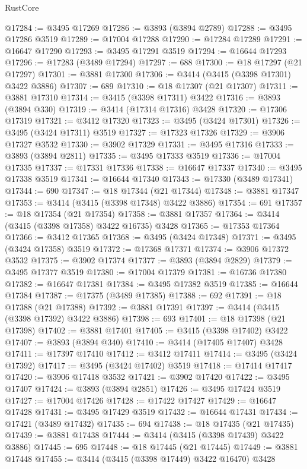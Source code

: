 \begin{lexlean}{RustCore}
\begin{coremodule}
@17284 := @3495 @17269
@17286 := @3893 (@3894 @2789)
@17288 := @3495 @17286 @3519
@17289 := @17004 @17288
@17290 := @17284 @17289
@17291 := @16647 @17290
@17293 := @3495 @17291 @3519
@17294 := @16644 @17293
@17296 := @17283 (@3489 @17294)
@17297 := 688
@17300 := @18 @17297 (@21 @17297)
@17301 := @3881 @17300
@17306 := @3414 (@3415 (@3398 @17301) @3422 @3886)
@17307 := 689
@17310 := @18 @17307 (@21 @17307)
@17311 := @3881 @17310
@17314 := @3415 (@3398 @17311) @3422
@17316 := @3893 (@3894 @330)
@17319 := @3414 (@17314 @17316) @3428
@17320 := @17306 @17319
@17321 := @3412 @17320
@17323 := @3495 (@3424 @17301)
@17326 := @3495 (@3424 @17311) @3519
@17327 := @17323 @17326
@17329 := @3906 @17327 @3532
@17330 := @3902 @17329
@17331 := @3495 @17316
@17333 := @3893 (@3894 @2811)
@17335 := @3495 @17333 @3519
@17336 := @17004 @17335
@17337 := @17331 @17336
@17338 := @16647 @17337
@17340 := @3495 @17338 @3519
@17341 := @16644 @17340
@17343 := @17330 (@3489 @17341)
@17344 := 690
@17347 := @18 @17344 (@21 @17344)
@17348 := @3881 @17347
@17353 := @3414 (@3415 (@3398 @17348) @3422 @3886)
@17354 := 691
@17357 := @18 @17354 (@21 @17354)
@17358 := @3881 @17357
@17364 := @3414 (@3415 (@3398 @17358) @3422 @16735) @3428
@17365 := @17353 @17364
@17366 := @3412 @17365
@17368 := @3495 (@3424 @17348)
@17371 := @3495 (@3424 @17358) @3519
@17372 := @17368 @17371
@17374 := @3906 @17372 @3532
@17375 := @3902 @17374
@17377 := @3893 (@3894 @2829)
@17379 := @3495 @17377 @3519
@17380 := @17004 @17379
@17381 := @16736 @17380
@17382 := @16647 @17381
@17384 := @3495 @17382 @3519
@17385 := @16644 @17384
@17387 := @17375 (@3489 @17385)
@17388 := 692
@17391 := @18 @17388 (@21 @17388)
@17392 := @3881 @17391
@17397 := @3414 (@3415 (@3398 @17392) @3422 @3886)
@17398 := 693
@17401 := @18 @17398 (@21 @17398)
@17402 := @3881 @17401
@17405 := @3415 (@3398 @17402) @3422
@17407 := @3893 (@3894 @340)
@17410 := @3414 (@17405 @17407) @3428
@17411 := @17397 @17410
@17412 := @3412 @17411
@17414 := @3495 (@3424 @17392)
@17417 := @3495 (@3424 @17402) @3519
@17418 := @17414 @17417
@17420 := @3906 @17418 @3532
@17421 := @3902 @17420
@17422 := @3495 @17407
@17424 := @3893 (@3894 @2851)
@17426 := @3495 @17424 @3519
@17427 := @17004 @17426
@17428 := @17422 @17427
@17429 := @16647 @17428
@17431 := @3495 @17429 @3519
@17432 := @16644 @17431
@17434 := @17421 (@3489 @17432)
@17435 := 694
@17438 := @18 @17435 (@21 @17435)
@17439 := @3881 @17438
@17444 := @3414 (@3415 (@3398 @17439) @3422 @3886)
@17445 := 695
@17448 := @18 @17445 (@21 @17445)
@17449 := @3881 @17448
@17455 := @3414 (@3415 (@3398 @17449) @3422 @16470) @3428

\end{coremodule}
\end{lexlean}
